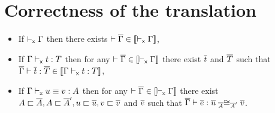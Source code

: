 \section{Correctness of the translation}
\label{sec:corr-transl}
\begin{theorem}[Translation]
  \leavevmode
  \begin{itemize}
    \item If $\xisctx{\Ga}$ then there exists
    $\isctx{\Gb} \in \transl{\xisctx{\Ga}}$,

    \item If $\xisterm{\Ga}{t}{T}$ then for any
    $\isctx{\Gb} \in \transl{\xisctx{\Ga}}$ there exist $\tb$ and $\Tb$ such that
    $\isterm{\Gb}{\tb}{\Tb} \in \transl{\xisterm{\Ga}{t}{T}}$,

    \item If $\xeqterm{\Ga}{u}{v}{A}$ then for any
    $\isctx{\Gb} \in \transl{\xisctx{\Ga}}$ there exist
    $A \ir \Ab, A \ir \Ab', u \ir \ub, v \ir \vb$ and $\eb$ such that
    $\isterm{\Gb}{\eb}{\Heq{\Ab}{\ub}{\Ab'}{\vb}}$.
  \end{itemize}
\end{theorem}

